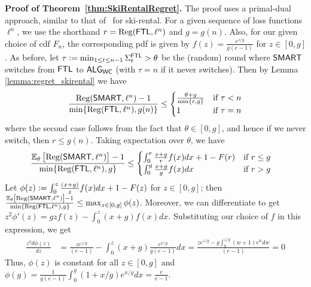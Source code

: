 {\bf Proof of Theorem~\ref{thm:SkiRentalRegret}.}
The proof uses a primal-dual approach, similar to that of~\cite{karlin1994competitive} for ski-rental.
For a given sequence of loss functions $\ell^n$, we use the shorthand $r= \mathrm{Reg}(\mathsf{FTL},\ell^n)$ and $g=g(n)$.
Also, for our given choice of cdf $F_n$, the corresponding pdf is given by $f(z) = \frac{e^{z/g}}{g(e-1)}$ for $z\in[0,g]$. 
As before, let $\tau \mathrel{\mathop{:}}= \min_{1 \le t \le n-1} \Sigma^{\mathsf{FTL}}_t > \theta$ be the (random) round where $\mathsf{SMART}$ switches from $\mathsf{FTL}$ to $\mathsf{ALG}_{\mathsf{WC}}$ (with $\tau=n$ if it never switches). Then by Lemma \ref{lemma:regret_skirental} we have
\begin{align*}
\frac{\mathrm{Reg}(\mathsf{SMART},\ell^n) -1}{\min\{\mathrm{Reg}(\mathsf{FTL},\ell^n),g(n)\}}\leq \begin{cases} 
   \frac{\theta + g}{\min\{r,g\}} & \text{if } \tau < n \\
   1       & \text{if } \tau = n
  \end{cases}
\end{align*}
where the second case follows from the fact that $\theta\in[0,g]$, and hence if we never switch, then $r\le g(n)$. 
Taking expectation over $\theta$, we have
\begin{align*}
&\frac{\operatorname{\mathbb{E}}_{\theta}\left[\mathrm{Reg}(\mathsf{SMART},\ell^n)\right]-1}{\min\{\mathrm{Reg}(\mathsf{FTL},\ell^n),g\}}
\le 
\begin{cases} 
   \int_0^r   \frac{x + g}{r}f(x)dx + 1 - F(r)  & \text{if } r \le g \\
   \int_0^g   \frac{x + g}{g}f(x)dx        & \text{if } r > g
  \end{cases}
\end{align*}
Let $\phi(z) \mathrel{\mathop{:}}=  \int_0^z \frac{(x + g)}{z}f(x)dx + 1 - F(z) $ for $z\in[0,g]$; then $\frac{\operatorname{\mathbb{E}}_{\theta}\left[\mathrm{Reg}(\mathsf{SMART},\ell^n)\right]-1}{\min\{\mathrm{Reg}(\mathsf{FTL},\ell^n),g\}} \leq \max_{z\in[0,g]}\phi(z)$. Moreover, we can differentiate to get $z^2\phi'(z)= gzf(z) - \int_0^z(x + g)f(x)dx$. Substituting our choice of $f$ in this expression, we get
\begin{align*}
\frac{z^2d\phi(z)}{dz} &= \frac{ze^{z/g}}{(e-1)} - \int_0^z(x + g)\frac{e^{x/g}}{g(e-1)}dx
=\frac{ze^{z/g} - g\int_0^{z/g}(w + 1)e^{w}dw}{(e-1)}=0
\end{align*}
Thus, $\phi(z)$ is constant for all $z\in[0,g]$ and $\phi(g) = \frac{1}{g(e-1)}\int_0^g(1+x/g)e^{x/g}dx = \frac{e}{e-1}$. 


